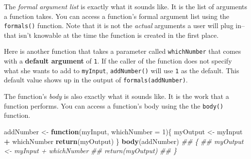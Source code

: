 \documentclass[12pt,krantz2]{krantz}
\makeatletter
\newenvironment{Shaded}{\begin{snugshade}}{\end{snugshade}}
\newcommand{\CommentTok}[1]{\textcolor[rgb]{0.37,0.37,0.37}{\textit{#1}}}
\newcommand{\ControlFlowTok}[1]{\textcolor[rgb]{0.27,0.27,0.27}{\textbf{#1}}}
\newcommand{\DataTypeTok}[1]{\textcolor[rgb]{0.27,0.27,0.27}{#1}}
\newcommand{\DecValTok}[1]{\textcolor[rgb]{0.06,0.06,0.06}{#1}}
\newcommand{\KeywordTok}[1]{\textcolor[rgb]{0.27,0.27,0.27}{\textbf{#1}}}
\newcommand{\NormalTok}[1]{#1}
\newcommand{\OperatorTok}[1]{\textcolor[rgb]{0.43,0.43,0.43}{\textbf{#1}}}
\newcommand{\StringTok}[1]{\textcolor[rgb]{0.5,0.5,0.5}{#1}}
\newenvironment{kframe}{%
\medskip{}
\setlength{\fboxsep}{.8em}
 \def\at@end@of@kframe{}%
 \ifinner\ifhmode%
  \def\at@end@of@kframe{\end{minipage}}%
  \begin{minipage}{\columnwidth}%
 \fi\fi%
 \def\FrameCommand##1{\hskip\@totalleftmargin \hskip-\fboxsep
 \colorbox{shadecolor}{##1}\hskip-\fboxsep
     \hskip-\linewidth \hskip-\@totalleftmargin \hskip\columnwidth}%
 \MakeFramed {\advance\hsize-\width
   \@totalleftmargin\z@ \linewidth\hsize
   \@setminipage}}%
 {\par\unskip\endMakeFramed%
 \at@end@of@kframe}
\renewenvironment{Shaded}{\begin{kframe}}{\end{kframe}}
\makeatother
\begin{document}
The \emph{formal argument list} is exactly what it sounds like. It is the list of arguments a function takes. You can access a function's formal argument list using the \texttt{formals()} function. Note that it is not the \emph{actual} arguments a user will plug in--that isn't knowable at the time the function is created in the first place.

Here is another function that takes a parameter called \texttt{whichNumber} that comes with a \textbf{default argument} of \texttt{1}. If the caller of the function does not specify what she wants to add to \texttt{myInput}, \texttt{addNumber()} will use \texttt{1} as the default. This default value shows up in the output of \texttt{formals(addNumber)}.

\begin{Shaded}
\end{Shaded}

The function's \emph{body} is also exactly what it sounds like. It is the work that a function performs. You can access a function's body using the the \texttt{body()} function.

\begin{Shaded}
\begin{Highlighting}[]
\NormalTok{addNumber <-}\StringTok{ }\ControlFlowTok{function}\NormalTok{(myInput, }\DataTypeTok{whichNumber =} \DecValTok{1}\NormalTok{)\{  }
\NormalTok{  myOutput <-}\StringTok{ }\NormalTok{myInput }\OperatorTok{+}\StringTok{ }\NormalTok{whichNumber}
  \KeywordTok{return}\NormalTok{(myOutput)}
\NormalTok{\}}
\KeywordTok{body}\NormalTok{(addNumber)}
\CommentTok{## \{}
\CommentTok{##     myOutput <- myInput + whichNumber}
\CommentTok{##     return(myOutput)}
\CommentTok{## \}}
\end{Highlighting}
\end{Shaded}
\end{document}
